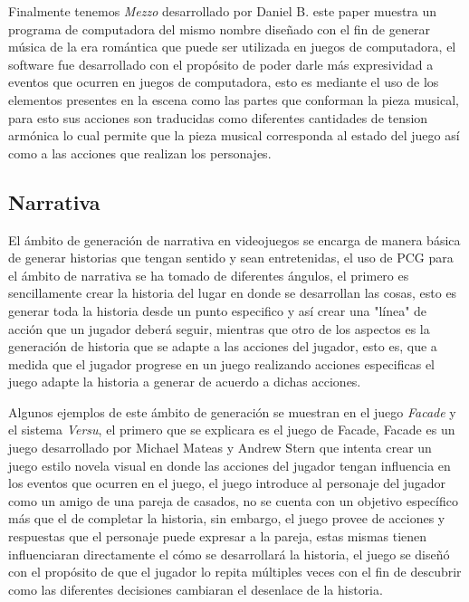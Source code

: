 Finalmente tenemos \textit{Mezzo} desarrollado por Daniel B. este paper muestra
un programa de computadora del mismo nombre diseñado con el fin de generar
música de la era romántica que puede ser utilizada en juegos de computadora, el
software fue desarrollado con el propósito de poder darle más expresividad a
eventos que ocurren en juegos de computadora, esto es mediante el uso de los
elementos presentes en la escena como las partes que conforman la pieza musical,
para esto sus acciones son traducidas como diferentes cantidades de tension
armónica lo cual permite que la pieza musical corresponda al estado del juego
así como a las acciones que realizan los personajes.

\subsection{Narrativa}
\label{subsection:Narrative}

El ámbito de generación de narrativa en videojuegos se encarga de manera básica
de generar historias que tengan sentido y sean entretenidas, el uso de PCG para
el ámbito de narrativa se ha tomado de diferentes ángulos, el primero es
sencillamente crear la historia del lugar en donde se desarrollan las cosas,
esto es generar toda la historia desde un punto especifico y así crear una
"línea" de acción que un jugador deberá seguir, mientras que otro de los
aspectos es la generación de historia que se adapte a las acciones del jugador,
esto es, que a medida que el jugador progrese en un juego realizando acciones
especificas el juego adapte la historia a generar de acuerdo a dichas acciones.

Algunos ejemplos de este ámbito de generación se muestran en el juego
\textit{Facade} y el sistema \textit{Versu}, el primero que se explicara es el
juego de Facade, Facade es un juego desarrollado por Michael Mateas y Andrew
Stern \cite{mateas2003faccade} que intenta crear un juego estilo novela visual
en donde las acciones del jugador tengan influencia en los eventos que ocurren
en el juego, el juego introduce al personaje del jugador como un amigo de una
pareja de casados, no se cuenta con un objetivo específico más que el de
completar la historia, sin embargo, el juego provee de acciones y respuestas que
el personaje puede expresar a la pareja, estas mismas tienen influenciaran
directamente el cómo se desarrollará la historia, el juego se diseñó con el
propósito de que el jugador lo repita múltiples veces con el fin de descubrir
como las diferentes decisiones cambiaran el desenlace de la historia. 

